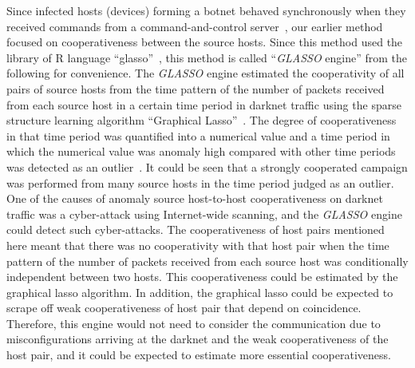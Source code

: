 \documentclass[conference]{IEEEtran}
\begin{document}
Since infected hosts (devices) forming a botnet behaved synchronously when they received commands from a command-and-control server~\cite{Akiyama}, our earlier method~\cite{Han} focused on cooperativeness between the source hosts.
Since this method used the library of R language ``glasso''~\cite{Friedman_glasso}, this method is called ``{\it GLASSO} engine'' from the following for convenience.
The {\it GLASSO} engine estimated the cooperativity of all pairs of source hosts from the time pattern of the number of packets received from each source host in a certain time period in darknet traffic using the sparse structure learning algorithm ``Graphical Lasso''~\cite{Friedman,Ide}.
The degree of cooperativeness in that time period was quantified into a numerical value and a time period in which the numerical value was anomaly high compared with other time periods was detected as an outlier~\cite{Han}.
It could be seen that a strongly cooperated campaign was performed from many source hosts in the time period judged as an outlier.
One of the causes of anomaly source host-to-host cooperativeness on darknet traffic was a cyber-attack using Internet-wide scanning, and the {\it GLASSO} engine could detect such cyber-attacks.
The cooperativeness of host pairs mentioned here meant that there was no cooperativity with that host pair when the time pattern of the number of packets received from each source host was conditionally independent between two hosts.
This cooperativeness could be estimated by the graphical lasso algorithm.
In addition, the graphical lasso could be expected to scrape off weak cooperativeness of host pair that depend on coincidence.
Therefore, this engine would not need to consider the communication due to misconfigurations arriving at the darknet and the weak cooperativeness of the host pair, and it could be expected to estimate more essential cooperativeness.
\end{document}
